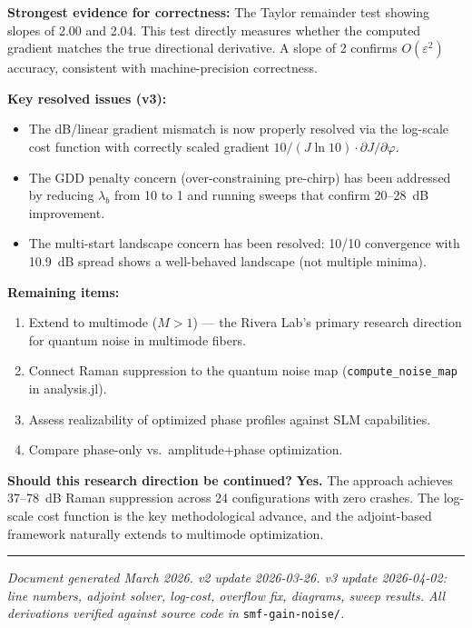 \documentclass[12pt,a4paper]{article}
\theoremstyle{definition}
\begin{document}
\textbf{Strongest evidence for correctness:} The Taylor remainder test showing slopes of 2.00 and 2.04. This test directly measures whether the computed gradient matches the true directional derivative. A slope of 2 confirms $O(\varepsilon^2)$ accuracy, consistent with machine-precision correctness.

\textbf{Key resolved issues (v3):}
\begin{itemize}[leftmargin=*]
\item The dB/linear gradient mismatch is now properly resolved via the log-scale cost function with correctly scaled gradient $10/(J\ln 10) \cdot \partial J/\partial\varphi$.
\item The GDD penalty concern (over-constraining pre-chirp) has been addressed by reducing $\lambda_b$ from 10 to 1 and running sweeps that confirm 20--28~dB improvement.
\item The multi-start landscape concern has been resolved: 10/10 convergence with 10.9~dB spread shows a well-behaved landscape (not multiple minima).
\end{itemize}

\textbf{Remaining items:}
\begin{enumerate}[leftmargin=*]
\item Extend to multimode ($M > 1$) --- the Rivera Lab's primary research direction for quantum noise in multimode fibers.
\item Connect Raman suppression to the quantum noise map (\texttt{compute\_noise\_map} in analysis.jl).
\item Assess realizability of optimized phase profiles against SLM capabilities.
\item Compare phase-only vs.\ amplitude+phase optimization.
\end{enumerate}

\textbf{Should this research direction be continued?} \textcolor{green!60!black}{\textbf{Yes.}} The approach achieves 37--78~dB Raman suppression across 24 configurations with zero crashes. The log-scale cost function is the key methodological advance, and the adjoint-based framework naturally extends to multimode optimization.

\vspace{1em}
\hrule
\vspace{0.5em}
{\small\textit{Document generated March 2026. v2 update 2026-03-26. v3 update 2026-04-02: line numbers, adjoint solver, log-cost, overflow fix, diagrams, sweep results. All derivations verified against source code in} \texttt{smf-gain-noise/}\textit{.}}
\end{document}
